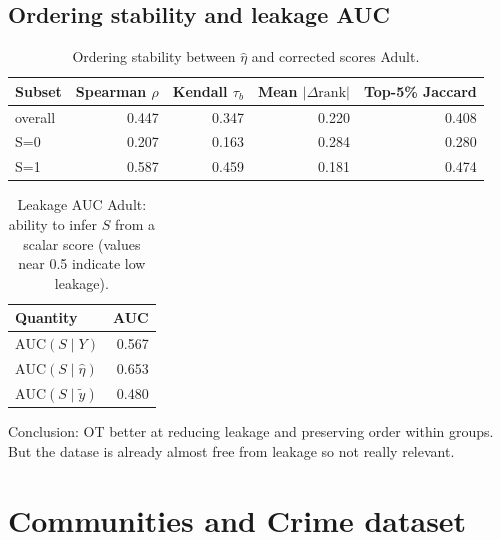\documentclass[11pt]{article}
\begin{document}
\subsection{Ordering stability and leakage AUC}


\begin{table}[t]
  \centering
  \begin{tabular}{lrrrr}
  \toprule
  Subset & Spearman $\rho$ & Kendall $\tau_b$ & Mean $|\Delta\mathrm{rank}|$ & Top-5\% Jaccard \\
  \midrule
  overall & 0.447 & 0.347 & 0.220 & 0.408 \\
  S=0 & 0.207 & 0.163 & 0.284 & 0.280 \\
  S=1 & 0.587 & 0.459 & 0.181 & 0.474 \\
  \bottomrule
  \end{tabular}
  \caption[Ordering stability between eta-hat and corrected scores.]{Ordering stability between $\hat\eta$ and corrected scores Adult.}
  \label{tab:ordering}
  \end{table}
  
  \begin{table}[t]
  \centering
  \begin{tabular}{lr}
  \toprule
  Quantity & AUC \\
  \midrule
  $\mathrm{AUC}(S\mid Y)$ & 0.567 \\
  $\mathrm{AUC}(S\mid \hat{\eta})$ & 0.653 \\
  $\mathrm{AUC}(S\mid \tilde{y})$ & 0.480 \\
  \bottomrule
  \end{tabular}
  \caption[Leakage AUC summary.]{Leakage AUC Adult: ability to infer $S$ from a scalar score (values near 0.5 indicate low leakage).}
  \label{tab:auc}
  \end{table}
  

  Conclusion: OT better at reducing leakage and preserving order within groups. But the datase is already almost free from leakage so not really relevant. 

  \section{Communities and Crime dataset}
\end{document}
